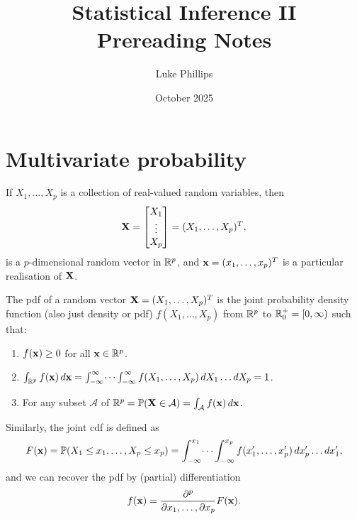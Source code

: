 \documentclass[10pt, a4paper]{article}
\title{Statistical Inference II \\
    \large Prereading Notes}
\author{Luke Phillips}
\date{October 2025}
\begin{document}
\maketitle

\newpage

\tableofcontents

\newpage

\section{Multivariate probability}

\begin{definition}
    If $X_1, \dotsc, X_p$ is a collection of real-valued random variables,
    then
    \[
    \mathbf{X} = \begin{bmatrix}
        X_1 \\ \vdots \\ X_p
    \end{bmatrix} = (X_1, \dotsc, X_p) ^ T,
    \]
    is a $p$-dimensional random vector in $\mathbb{R} ^ p$,
    and $\mathbf{x} = (x_1, \dotsc, x_p) ^ T$ is a particular realisation of $\mathbf{X}$.
\end{definition}

\begin{definition}
    The pdf of a random vector $\mathbf{X} = (X_1, \dotsc, X_p) ^ T$ is the joint probability density function
    (also just density or pdf)
    $f(X_1, \dotsc, X_p)$ from $\mathbb{R} ^ p$ to $\mathbb{R}_{0}^{+} = [0, \infty)$ such that:
    \begin{enumerate}[label = \roman*)]
        \item $f(\mathbf{x}) \geq 0$ for all $\mathbf{x} \in \mathbb{R} ^ p$.

        \item $\int_{\mathbb{R} ^ p}f(\mathbf{x})\,d\mathbf{x} = \int_{-\infty}^{\infty}\dotsi\int_{-\infty}^{\infty}f(X_1, \dotsc, X_p)\,dX_1\dotsc dX_p = 1$.

        \item For any subset $\mathcal{A}$ of $\mathbb{R} ^ p = \mathbb{P}(\mathbf{X} \in \mathcal{A}) = \int_{\mathcal{A}}f(\mathbf{x})\,d\mathbf{x}$.
    \end{enumerate}
\end{definition}

\begin{definition}
    Similarly,
    the joint cdf is defined as
    \[
    F(\mathbf{x}) = \mathbb{P}(X_1 \leq x_1, \dotsc, X_p \leq x_p) = \int_{-\infty}^{x_1} \dotsi \int_{-\infty}^{x_p}f(x_1', \dotsc, x_p')\,dx_p'\dotsc dx_1',
    \]
    and we can recover the pdf by
    (partial)
    differentiation
    \[
    f(\mathbf{x}) = \frac{\partial ^ p}{\partial x_1, \dotsc, \partial x_p}F(\mathbf{x}).
    \]
\end{definition}
\end{document}
